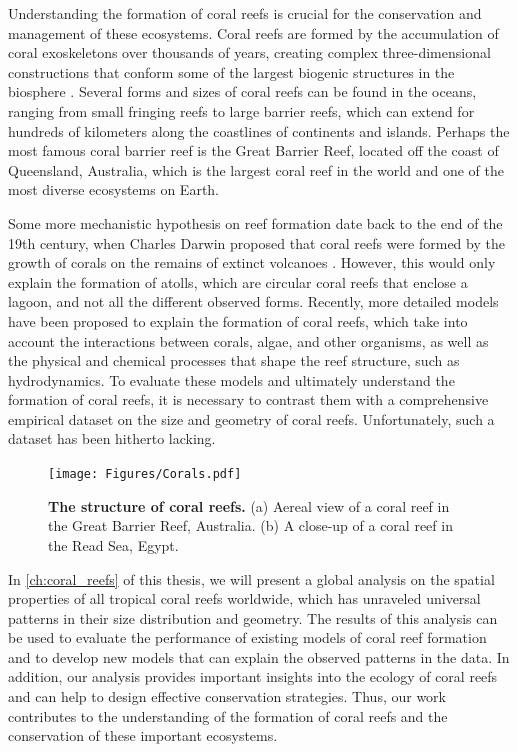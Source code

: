 Understanding the formation of coral reefs is crucial for the conservation and
management of these ecosystems. Coral reefs are formed by the accumulation of
coral exoskeletons over thousands of years, creating complex three-dimensional
constructions that conform some of the largest biogenic structures in the
biosphere \cite{wiener2021exploration}. Several forms and sizes of coral reefs
can be found in the oceans, ranging from small fringing reefs to large barrier
reefs, which can extend for hundreds of kilometers along the coastlines of
continents and islands. Perhaps the most famous coral barrier reef is the
Great Barrier Reef, located off the coast of Queensland, Australia, which is
the largest coral reef in the world and one of the most diverse ecosystems on
Earth.

Some more mechanistic hypothesis on reef formation date back to the end of the
19th century, when Charles Darwin proposed that coral reefs were formed by the
growth of corals on the remains of extinct volcanoes
\cite{darwin1874structure}. However, this would only explain the formation of
atolls, which are circular coral reefs that enclose a lagoon, and not all the
different observed forms. Recently, more detailed models have been proposed
to explain the formation of coral reefs, which take into account the
interactions between corals, algae, and other organisms, as well as the
physical and chemical processes that shape the reef structure, such as
hydrodynamics. To evaluate these models and ultimately understand the
formation of coral reefs, it is necessary to contrast them with a comprehensive
empirical dataset on the size and geometry of coral reefs. Unfortunately, such
a dataset has been hitherto lacking.

\begin{figure}[H]
  \centering
  \texttt{[image: Figures/Corals.pdf]}
  \caption[The structure of a coral reef]{
    \textbf{The structure of coral reefs.} (a) Aereal view of a coral reef in
    the Great Barrier Reef, Australia. (b) A close-up of a coral reef in the
    Read Sea, Egypt.}
  \label{fig:Coral_reef}
\end{figure}

In \cref{ch:coral_reefs} of this thesis, we will present a global analysis on
the spatial properties of all tropical coral reefs worldwide, which has
unraveled universal patterns in their size distribution and geometry. The
results of this analysis can be used to evaluate the performance of existing
models of coral reef formation and to develop new models that can explain the
observed patterns in the data. In addition, our analysis provides important
insights into the ecology of coral reefs and can help to design effective
conservation strategies. Thus, our work contributes to the understanding of the
formation of coral reefs and the conservation of these important ecosystems.

